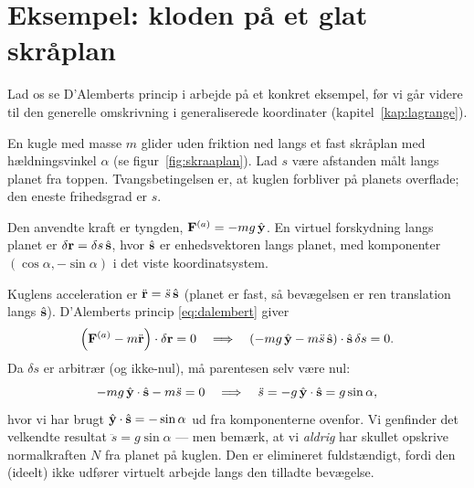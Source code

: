 \section{Eksempel: kloden på et glat skråplan}

Lad os se D'Alemberts princip i arbejde på et konkret eksempel, før vi
går videre til den generelle omskrivning i generaliserede koordinater
(kapitel~\ref{kap:lagrange}).

\begin{eksempel}
En kugle med masse $m$ glider uden friktion ned langs et fast skråplan
med hældningsvinkel $\alpha$ (se figur~\ref{fig:skraaplan}). Lad $s$
være afstanden målt langs planet fra toppen. Tvangsbetingelsen er, at
kuglen forbliver på planets overflade; den eneste frihedsgrad er $s$.

Den anvendte kraft er tyngden, $\vb{F}^{(a)} = -mg\,\hat{\vb{y}}$. En
virtuel forskydning langs planet er $\delta\vb{r} = \delta s\,\hat{\vb{s}}$,
hvor $\hat{\vb{s}}$ er enhedsvektoren langs planet, med komponenter
$(\cos\alpha, -\sin\alpha)$ i det viste koordinatsystem.

Kuglens acceleration er $\ddot{\vb{r}} = \ddot{s}\,\hat{\vb{s}}$ (planet
er fast, så bevægelsen er ren translation langs $\hat{\vb{s}}$).
D'Alemberts princip \eqref{eq:dalembert} giver
\begin{equation}
  \left(\vb{F}^{(a)} - m\ddot{\vb{r}}\right)\cdot\delta\vb{r} = 0
  \quad\Longrightarrow\quad
  \left(-mg\,\hat{\vb{y}} - m\ddot{s}\,\hat{\vb{s}}\right)\cdot\hat{\vb{s}}\,\delta s = 0.
\end{equation}
Da $\delta s$ er arbitrær (og ikke-nul), må parentesen selv være nul:
\begin{equation}
  -mg\,\hat{\vb{y}}\cdot\hat{\vb{s}} - m\ddot{s} = 0
  \quad\Longrightarrow\quad
  \ddot{s} = -g\,\hat{\vb{y}}\cdot\hat{\vb{s}} = g\sin\alpha,
\end{equation}
hvor vi har brugt $\hat{\vb{y}}\cdot\hat{\vb{s}} = -\sin\alpha$ ud fra
komponenterne ovenfor. Vi genfinder det velkendte resultat
$\ddot{s}=g\sin\alpha$ — men bemærk, at vi \emph{aldrig} har skullet
opskrive normalkraften $N$ fra planet på kuglen. Den er elimineret
fuldstændigt, fordi den (ideelt) ikke udfører virtuelt arbejde langs
den tilladte bevægelse.
\end{eksempel}

